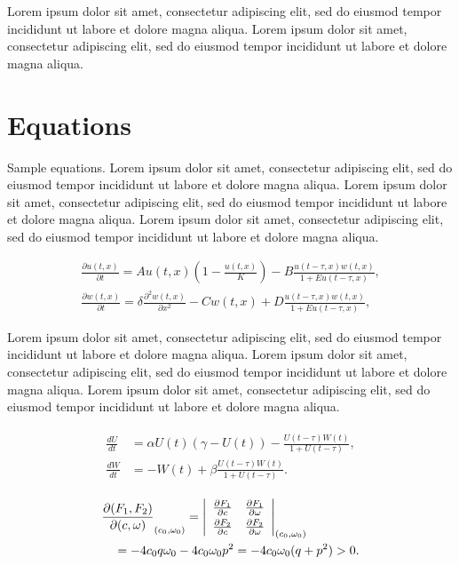 \documentclass[
  journal=medium,
  manuscript=Qualcomm-Innovation-Fellowship-Proposal,
  year=22-February-2023,
]{cup-journal}
\begin{document}
Lorem ipsum dolor sit amet, consectetur adipiscing elit, sed do eiusmod tempor incididunt ut labore et dolore magna aliqua. Lorem ipsum dolor sit amet, consectetur adipiscing elit, sed do eiusmod tempor incididunt ut labore et dolore magna aliqua. 

\section{Equations}

Sample equations. Lorem ipsum dolor sit amet, consectetur adipiscing elit, sed do eiusmod tempor incididunt ut labore et dolore magna aliqua. Lorem ipsum dolor sit amet, consectetur adipiscing elit, sed do eiusmod tempor incididunt ut labore et dolore magna aliqua. Lorem ipsum dolor sit amet, consectetur adipiscing elit, sed do eiusmod tempor incididunt ut labore et dolore magna aliqua. 


\begin{equation}
\begin{aligned}\label{eq:first}
\frac{\partial u(t,x)}{\partial t} = Au(t,x) \left(1-\frac{u(t,x)}{K}\right)
 -B\frac{u(t-\tau,x) w(t,x)}{1+Eu(t-\tau,x)},\\
\frac{\partial w(t,x)}{\partial t} =\delta \frac{\partial^2w(t,x)}{\partial x^2}-Cw(t,x)
+D\frac{u(t-\tau,x)w(t,x)}{1+Eu(t-\tau,x)},
\end{aligned}
\end{equation}

 Lorem ipsum dolor sit amet, consectetur adipiscing elit, sed do eiusmod tempor incididunt ut labore et dolore magna aliqua. Lorem ipsum dolor sit amet, consectetur adipiscing elit, sed do eiusmod tempor incididunt ut labore et dolore magna aliqua. Lorem ipsum dolor sit amet, consectetur adipiscing elit, sed do eiusmod tempor incididunt ut labore et dolore magna aliqua. 

\begin{align}\label{eq:another}
\begin{split}
\frac{dU}{dt} &=\alpha U(t)(\gamma -U(t))-\frac{U(t-\tau)W(t)}{1+U(t-\tau)},\\
\frac{dW}{dt} &=-W(t)+\beta\frac{U(t-\tau)W(t)}{1+U(t-\tau)}.
\end{split}
\end{align}


\begin{align*}
&\frac{\partial(F_1,F_2)}{\partial(c,\omega)}_{(c_0,\omega_0)} = \left|
\begin{array}{ll}
\frac{\partial F_1}{\partial c} &\frac{\partial F_1}{\partial \omega} \\\noalign{\vskip3pt}
\frac{\partial F_2}{\partial c}&\frac{\partial F_2}{\partial \omega}
\end{array}\right|_{(c_0,\omega_0)}\\
&\quad=-4c_0q\omega_0 -4c_0\omega_0p^2 =-4c_0\omega_0(q+p^2)>0.
\end{align*}
\end{document}
